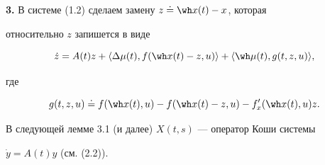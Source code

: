 \medskip


\addtocounter{section}{1}


\setcounter{equation}{0}


\setcounter{thms}{0}


\setcounter{lems}{0}


\setcounter{cors}{0}


\setcounter{notes}{0}


\setcounter{defns}{0}


\setcounter{footnote}{0}





{\bf 3.} В системе (1.2) сделаем замену $z\doteq\wh x(t)-x$, которая


относительно $z$ запишется в виде


\begin{equation}


\Dot z=A(t)z+\langle\Delta\mu(t),f(\wh x(t)-z,u)\rangle+


\langle\wh \mu(t),g(t,z,u)\rangle,


\end{equation}


где


\begin{equation}


g(t,z,u)\doteq f(\wh x(t),u)-f(\wh x(t)-z,u)-f'_x(\wh x(t),u)z.


\end{equation}





В следующей лемме 3.1 (и далее) $X(t,s)$ --- оператор Коши системы


$\Dot y=A(t)y$ (см. (2.2)).





